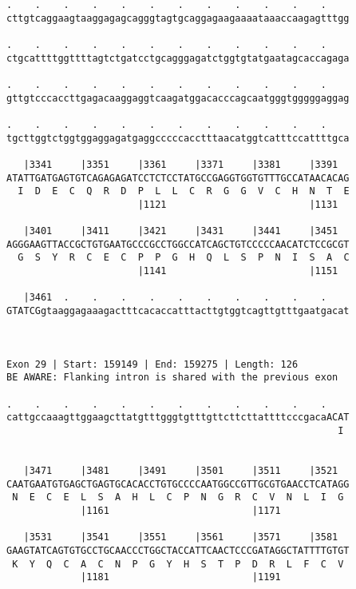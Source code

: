 \documentclass{article}
\begin{document}
\begin{Verbatim}
.    .    .    .    .    .    .    .    .    .    .    .    
cttgtcaggaagtaaggagagcagggtagtgcaggagaagaaaataaaccaagagtttgg
                                                            
.    .    .    .    .    .    .    .    .    .    .    .    
ctgcattttggttttagtctgatcctgcagggagatctggtgtatgaatagcaccagaga
                                                            
.    .    .    .    .    .    .    .    .    .    .    .    
gttgtcccaccttgagacaaggaggtcaagatggacacccagcaatgggtgggggaggag
                                                            
.    .    .    .    .    .    .    .    .    .    .    .    
tgcttggtctggtggaggagatgaggcccccacctttaacatggtcatttccattttgca
                                                            
   |3341     |3351     |3361     |3371     |3381     |3391  
ATATTGATGAGTGTCAGAGAGATCCTCTCCTATGCCGAGGTGGTGTTTGCCATAACACAG
  I  D  E  C  Q  R  D  P  L  L  C  R  G  G  V  C  H  N  T  E
                       |1121                         |1131  
  
   |3401     |3411     |3421     |3431     |3441     |3451  
AGGGAAGTTACCGCTGTGAATGCCCGCCTGGCCATCAGCTGTCCCCCAACATCTCCGCGT
  G  S  Y  R  C  E  C  P  P  G  H  Q  L  S  P  N  I  S  A  C
                       |1141                         |1151  
  
   |3461  .    .    .    .    .    .    .    .    .    .    
GTATCGgtaaggagaaagactttcacaccatttacttgtggtcagttgtttgaatgacat
                                                            
  
 
Exon 29 | Start: 159149 | End: 159275 | Length: 126
BE AWARE: Flanking intron is shared with the previous exon
 
.    .    .    .    .    .    .    .    .    .    .    .    
cattgccaaagttggaagcttatgtttgggtgtttgttcttcttattttcccgacaACAT
                                                          I 
                                                            
  
   |3471     |3481     |3491     |3501     |3511     |3521  
CAATGAATGTGAGCTGAGTGCACACCTGTGCCCCAATGGCCGTTGCGTGAACCTCATAGG
 N  E  C  E  L  S  A  H  L  C  P  N  G  R  C  V  N  L  I  G 
             |1161                         |1171            
  
   |3531     |3541     |3551     |3561     |3571     |3581  
GAAGTATCAGTGTGCCTGCAACCCTGGCTACCATTCAACTCCCGATAGGCTATTTTGTGT
 K  Y  Q  C  A  C  N  P  G  Y  H  S  T  P  D  R  L  F  C  V 
             |1181                         |1191            
  

\end{Verbatim}
\end{document}
